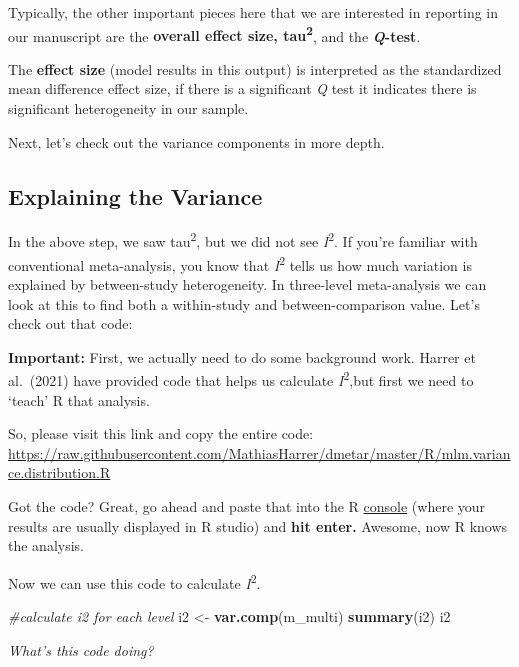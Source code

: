 \documentclass[
]{book}
\newenvironment{Shaded}{\begin{snugshade}}{\end{snugshade}}
\newcommand{\CommentTok}[1]{\textcolor[rgb]{0.56,0.35,0.01}{\textit{#1}}}
\newcommand{\FunctionTok}[1]{\textcolor[rgb]{0.13,0.29,0.53}{\textbf{#1}}}
\newcommand{\NormalTok}[1]{#1}
\newcommand{\OtherTok}[1]{\textcolor[rgb]{0.56,0.35,0.01}{#1}}
\begin{document}
Typically, the other important pieces here that we are interested in reporting in our manuscript are the \textbf{overall effect size, tau\textsuperscript{2}}, and the \textbf{\emph{Q}-test}.

The \textbf{effect size} (model results in this output) is interpreted as the standardized mean difference effect size, if there is a significant \emph{Q} test it indicates there is significant heterogeneity in our sample.

Next, let's check out the variance components in more depth.

\hypertarget{explaining-the-variance}{%
\subsection{Explaining the Variance}\label{explaining-the-variance}}

In the above step, we saw tau\textsuperscript{2}, but we did not see \emph{I}\textsuperscript{2}. If you're familiar with conventional meta-analysis, you know that \emph{I}\textsuperscript{2} tells us how much variation is explained by between-study heterogeneity. In three-level meta-analysis we can look at this to find both a within-study and between-comparison value. Let's check out that code:

\textbf{Important:} First, we actually need to do some background work. Harrer et al.~(2021)\citep{harrer2021} have provided code that helps us calculate \emph{I}\textsuperscript{2},but first we need to `teach' R that analysis.

So, please visit this link and copy the entire code: \url{https://raw.githubusercontent.com/MathiasHarrer/dmetar/master/R/mlm.variance.distribution.R}

Got the code? Great, go ahead and paste that into the R \ul{console} (where your results are usually displayed in R studio) and \textbf{hit enter.} Awesome, now R knows the analysis.

Now we can use this code to calculate \emph{I}\textsuperscript{2}.

\begin{Shaded}
\begin{Highlighting}[]
\CommentTok{\#calculate i2 for each level}
\NormalTok{i2 }\OtherTok{\textless{}{-}} \FunctionTok{var.comp}\NormalTok{(m\_multi)}
\FunctionTok{summary}\NormalTok{(i2)}
\NormalTok{i2}
\end{Highlighting}
\end{Shaded}

\emph{What's this code doing?}
\end{document}
